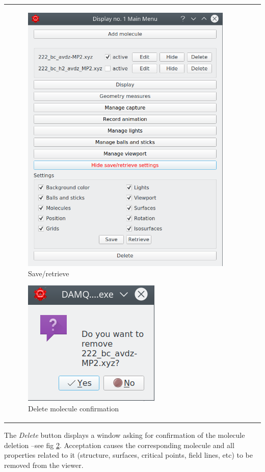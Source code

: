 \documentclass[10pt]{article}
\begin{document}
\begin{tabular}{lcr}
\begin{minipage}{.5\linewidth}
\begin{figure}[H]
    \begin{center}
        \includegraphics[width=0.5\linewidth]{damqt320_3D_settings.png}
    \end{center}
    \vspace*{5mm}
    \caption{Save/retrieve \label{fig:4_12}}
\end{figure}

\begin{figure}[H]
    \begin{center}
        \includegraphics[width=0.4\linewidth]{damqt320_molecule_delete.png}
    \end{center}
    \caption{Delete molecule confirmation \label{fig:4_13_1}}
\end{figure}
\end{minipage}
\end{tabular}

\vspace*{5mm}


The {\it Delete} button displays a window asking for confirmation 
of the molecule deletion --see fig \ref{fig:4_13_1}. Acceptation causes the corresponding molecule 
and all properties related to it (structure, surfaces, critical points, field lines, etc)
to be removed from the viewer.
\end{document}
